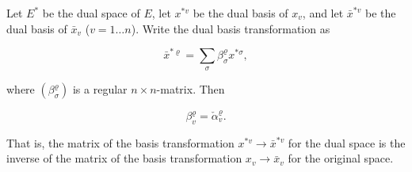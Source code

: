 Let $E^*$ be the dual space of $E$, let $x^{*v}$ be the dual basis of $x_v$, and let $\bar{x}^{*v}$ be the dual basis of $\bar{x}_v$ ($v = 1 \ldots n$). Write the dual basis transformation as

$$\bar{x}^{*\varrho} = \sum_{\sigma} \beta_{\sigma}^{\varrho} x^{*\sigma},$$

where $(\beta_{\sigma}^{\varrho})$ is a regular $n \times n$-matrix. Then

$$\beta_{v}^{\varrho} = \check{\alpha}_{v}^{\varrho}.$$

That is, the matrix of the basis transformation $x^{*v} \to \bar{x}^{*v}$ for the dual space is the inverse of the matrix of the basis transformation $x_v \to \bar{x}_v$ for the original space.
